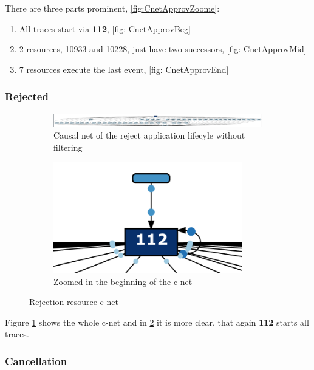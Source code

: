 There are three parts prominent, \ref{fig:CnetApprovZoome}:
\begin{enumerate}
	\item All traces start via \textbf{112}, \ref{fig: CnetApprovBeg}
	\item 2 resources, 10933 and 10228, just have two successors, \ref{fig: CnetApprovMid}
	\item 7 resources execute the last event, \ref{fig: CnetApprovEnd}
\end{enumerate}

\subsubsection{Rejected}

\begin{figure}[!htbp]
\centering
\begin{subfigure}{0.7\textwidth}
\includegraphics[width = 0.9\linewidth]{RejCNet.PNG}
\caption{Causal net of the reject application lifecyle without filtering}
\label{fig:CnetRej}
\end{subfigure}
\begin{subfigure}{0.2\textwidth}
\includegraphics[width = 0.9\textwidth]{RejCnetBeg.PNG}
\caption{Zoomed in the beginning of the c-net}
\label{fig:CnetRejZoome}
\end{subfigure}
\caption{Rejection resource c-net}
\label{fig:CnetRejto}
\end{figure}

Figure \ref{fig:CnetRej} shows the whole c-net and in \ref{fig:CnetRejZoome} it is more clear, that again \textbf{112} starts all traces.

\subsubsection{Cancellation} 

